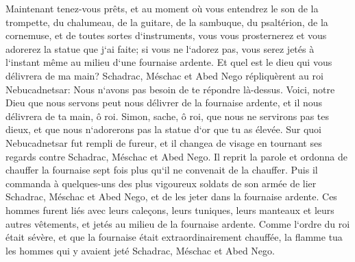 \verse Maintenant tenez-vous prêts, et au moment où vous entendrez le son de la trompette, du chalumeau, de la guitare, de la sambuque, du psaltérion, de la cornemuse, et de toutes sortes d`instruments, vous vous prosternerez et vous adorerez la statue que j`ai faite; si vous ne l`adorez pas, vous serez jetés à l`instant même au milieu d`une fournaise ardente. Et quel est le dieu qui vous délivrera de ma main? 
\verse Schadrac, Méschac et Abed Nego répliquèrent au roi Nebucadnetsar: Nous n`avons pas besoin de te répondre là-dessus. 
\verse Voici, notre Dieu que nous servons peut nous délivrer de la fournaise ardente, et il nous délivrera de ta main, ô roi. 
\verse Simon, sache, ô roi, que nous ne servirons pas tes dieux, et que nous n`adorerons pas la statue d`or que tu as élevée. 
\verse Sur quoi Nebucadnetsar fut rempli de fureur, et il changea de visage en tournant ses regards contre Schadrac, Méschac et Abed Nego. Il reprit la parole et ordonna de chauffer la fournaise sept fois plus qu`il ne convenait de la chauffer. 
\verse Puis il commanda à quelques-uns des plus vigoureux soldats de son armée de lier Schadrac, Méschac et Abed Nego, et de les jeter dans la fournaise ardente. 
\verse Ces hommes furent liés avec leurs caleçons, leurs tuniques, leurs manteaux et leurs autres vêtements, et jetés au milieu de la fournaise ardente. 
\verse Comme l`ordre du roi était sévère, et que la fournaise était extraordinairement chauffée, la flamme tua les hommes qui y avaient jeté Schadrac, Méschac et Abed Nego. 
